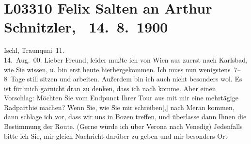 

\section[ Felix Salten an Arthur Schnitzler, 14. 8. 1900]{L03310 Felix Salten an Arthur Schnitzler,  14. 8. 1900}
\nopagebreak{}
\rehead{ }\normalsize\beginnumbering{}
\toendnotes[C]{\smallbreak\pagebreak[2]}
\toendnotes[C]{\smallbreak}
\toendnotes[C]{\smallbreak}
\pstart
           \raggedleft{}{\pb}Ischl, Traunquai 11. {\\}14. Aug. 00.\pend
           \vspace{0.5em}
\pstart
           Lieber Freund, leider mußte ich von Wien aus zuerst nach Karlsbad, wie Sie
               wissen, u. bin erst heute hierhergekommen. Ich muss
               nun wenigstens 7–8 Tage still sitzen und arbeiten. Außerdem bin ich auch nicht
               besonders wol. Es ist für mich garnicht dran zu denken, dass ich nach \label{K_L03310-1v}\label{K_L03310-1} komme. Aber einen Vorschlag: Möchten Sie vom Endpunct Ihrer Tour aus mit mir
               eine mehrtägige Radparthie machen? Wenn Sie, wie Sie mir
                  schreiben{[},{]} nach Meran
               kommen, dann schlage ich vor, dass wir uns in Bozen treffen, und überlasse dann Ihnen die Bestimmung der Route. (Gerne {\pb}würde ich über Verona nach Venedig)
               Jedenfalls bitte ich Sie, mir gleich Nachricht darüber zu geben und mir besonders Ort

